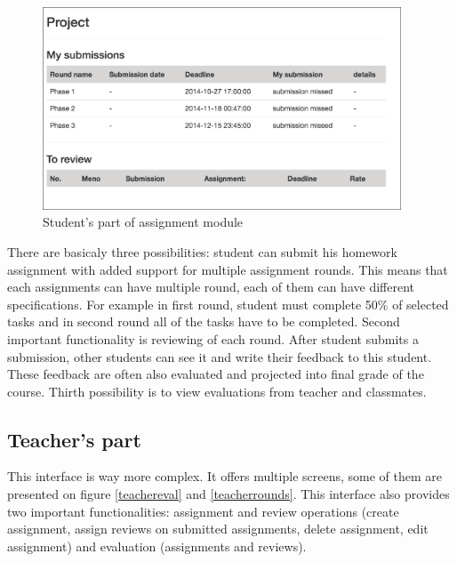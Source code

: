 \begin{figure}[h]
    \centering
    \includegraphics[width=0.95\textwidth]{images/assstudent.png}
    \caption{Student's part of assignment module}
    \label{assstudent}
\end{figure}


There are basicaly three possibilities: student can submit his homework assignment with added support for multiple assignment rounds. This means that each assignments can have multiple round, each of them can have different specifications. For example in first round, student must complete 50\% of selected tasks and in second round all of the tasks have to be completed. Second important functionality is reviewing of each round. After student submits a submission, other students can see it and write their feedback to this student. These feedback are often also evaluated and projected into final grade of the course. Thirth possibility is to view evaluations from teacher and classmates.

\subsection{Teacher's part}

This interface is way more complex. It offers multiple screens, some of them are presented on figure \ref{teachereval} and \ref{teacherrounds}. This interface also provides two important functionalities: assignment and review operations (create assignment, assign reviews on submitted assignments, delete assignment, edit assignment) and evaluation (assignments and reviews).



